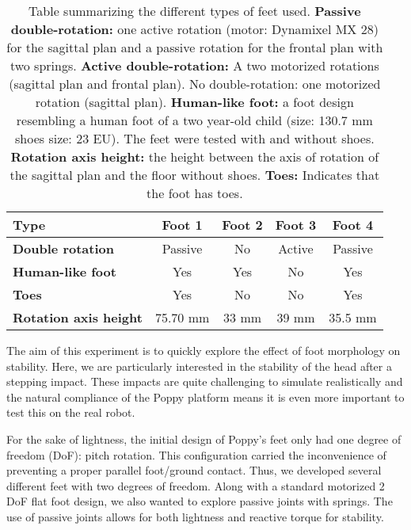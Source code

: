 \begin{table}
    \begin{center}
        \begin{tabular}{|l|c|c|c|c|}
        \hline
        \textbf{Type} & \textbf{Foot 1} & \textbf{Foot 2} & \textbf{Foot 3} & \textbf{Foot 4}\\
        \hline
        \textbf{Double rotation} & Passive & No & Active & Passive\\
        \hline
        \textbf{Human-like foot} & Yes & Yes & No & Yes\\
        \hline
        \textbf{Toes} & Yes & No & No & Yes\\
        \hline
        \textbf{Rotation axis height} & 75.70 mm & 33 mm & 39 mm & 35.5 mm\\
        \hline

        \end{tabular}
        \caption{Table summarizing the different types of feet used. \textbf{Passive double-rotation:}  one active rotation (motor: Dynamixel MX 28) for the sagittal plan and a passive rotation for the frontal plan with two springs. \textbf{Active double-rotation:}  A two motorized rotations (sagittal plan and frontal plan). No double-rotation:  one motorized rotation (sagittal plan). \textbf{Human-like foot:} a foot design resembling a human foot of a two year-old child (size: 130.7 mm shoes size: 23 EU). The feet were tested with and without shoes. \textbf{Rotation axis height:} the height between the axis of rotation of the sagittal plan and the floor without shoes. \textbf{Toes:} Indicates that the foot has toes.
        }
        \label{tab:table_feet}
    \end{center}
\end{table}

The aim of this experiment is to quickly explore the effect of foot morphology on stability. Here, we are particularly interested in the stability of the head after a stepping impact. These impacts are quite challenging to simulate realistically and the natural compliance of the Poppy platform means it is even more important to test this on the real robot.

For the sake of lightness, the initial design of Poppy's feet only had one degree of freedom (DoF): pitch rotation. This configuration carried the inconvenience of preventing a proper parallel foot/ground contact. Thus, we developed several different feet with two degrees of freedom. Along with a standard motorized 2 DoF flat foot design, we also wanted to explore passive joints with springs. The use of passive joints allows for both lightness and reactive torque for stability.

